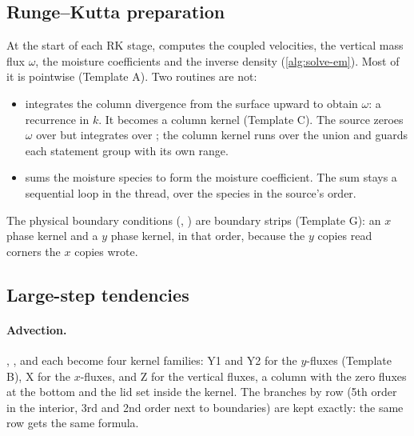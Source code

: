 \subsection{Runge--Kutta preparation}

At the start of each RK stage,  computes the coupled velocities, the vertical mass flux $\omega$,
the moisture coefficients and the inverse density (\cref{alg:solve-em}). Most of it is pointwise (Template A). Two
routines are not:
\begin{itemize}
  \item {} integrates the column divergence from the surface upward to obtain $\omega$: a recurrence in
    $k$. It becomes a column kernel (Template C). The source zeroes $\omega$ over  but integrates over
    ; the column kernel runs over the union and guards each statement group with its own range.
  \item {} sums the moisture species to form the moisture coefficient. The sum stays a sequential loop in
    the thread, over the species in the source's order.
\end{itemize}
The physical boundary conditions (, ) are boundary strips (Template G): an $x$ phase
kernel and a $y$ phase kernel, in that order, because the $y$ copies read corners the $x$ copies wrote.

\subsection{Large-step tendencies}

\paragraph{Advection.} , ,  and  each become four
kernel families: Y1 and Y2 for the $y$-fluxes (Template B), X for the $x$-fluxes, and Z for the vertical fluxes,
a column with the zero fluxes at the bottom and the lid set inside the kernel. The branches by row (5th order in the
interior, 3rd and 2nd order next to boundaries) are kept exactly: the same row gets the same formula.

